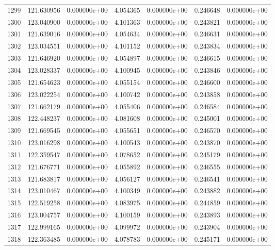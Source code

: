 \begin{tabular}{rrrrrrr}
1299 & 121.630956 &  0.000000e+00 &  4.054365 &  0.000000e+00 &    0.246648 &  0.000000e+00 \\
1300 & 123.040900 &  0.000000e+00 &  4.101363 &  0.000000e+00 &    0.243821 &  0.000000e+00 \\
1301 & 121.639016 &  0.000000e+00 &  4.054634 &  0.000000e+00 &    0.246631 &  0.000000e+00 \\
1302 & 123.034551 &  0.000000e+00 &  4.101152 &  0.000000e+00 &    0.243834 &  0.000000e+00 \\
1303 & 121.646920 &  0.000000e+00 &  4.054897 &  0.000000e+00 &    0.246615 &  0.000000e+00 \\
1304 & 123.028337 &  0.000000e+00 &  4.100945 &  0.000000e+00 &    0.243846 &  0.000000e+00 \\
1305 & 121.654623 &  0.000000e+00 &  4.055154 &  0.000000e+00 &    0.246600 &  0.000000e+00 \\
1306 & 123.022254 &  0.000000e+00 &  4.100742 &  0.000000e+00 &    0.243858 &  0.000000e+00 \\
1307 & 121.662179 &  0.000000e+00 &  4.055406 &  0.000000e+00 &    0.246584 &  0.000000e+00 \\
1308 & 122.448237 &  0.000000e+00 &  4.081608 &  0.000000e+00 &    0.245001 &  0.000000e+00 \\
1309 & 121.669545 &  0.000000e+00 &  4.055651 &  0.000000e+00 &    0.246570 &  0.000000e+00 \\
1310 & 123.016298 &  0.000000e+00 &  4.100543 &  0.000000e+00 &    0.243870 &  0.000000e+00 \\
1311 & 122.359547 &  0.000000e+00 &  4.078652 &  0.000000e+00 &    0.245179 &  0.000000e+00 \\
1312 & 121.676771 &  0.000000e+00 &  4.055892 &  0.000000e+00 &    0.246555 &  0.000000e+00 \\
1313 & 121.683817 &  0.000000e+00 &  4.056127 &  0.000000e+00 &    0.246541 &  0.000000e+00 \\
1314 & 123.010467 &  0.000000e+00 &  4.100349 &  0.000000e+00 &    0.243882 &  0.000000e+00 \\
1315 & 122.519258 &  0.000000e+00 &  4.083975 &  0.000000e+00 &    0.244859 &  0.000000e+00 \\
1316 & 123.004757 &  0.000000e+00 &  4.100159 &  0.000000e+00 &    0.243893 &  0.000000e+00 \\
1317 & 122.999165 &  0.000000e+00 &  4.099972 &  0.000000e+00 &    0.243904 &  0.000000e+00 \\
1318 & 122.363485 &  0.000000e+00 &  4.078783 &  0.000000e+00 &    0.245171 &  0.000000e+00 \\

\end{tabular}
